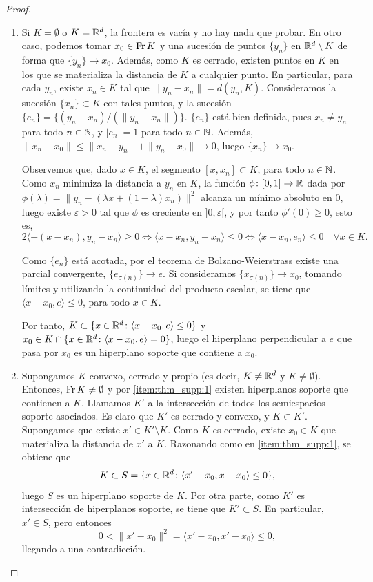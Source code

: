 \begin{proof}~
    \begin{enumerate}
        \item Si $K = \emptyset$ o $K = \mathbb{R}^d$, la frontera es vacía y no hay nada que probar. En otro caso, podemos tomar $x_0 \in \operatorname{Fr} K$ y una sucesión de puntos $\{y_n\}$ en $\mathbb{R}^d \setminus K$ de forma que $\{y_n\} \to x_0$. Además, como $K$ es cerrado, existen puntos en $K$ en los que se materializa la distancia de $K$ a cualquier punto. En particular, para cada $y_n$, existe $x_n \in K$ tal que $\|y_n - x_n\| = d(y_n,K)$. Consideramos la sucesión $\{x_n\} \subset K$ con tales puntos, y la sucesión $\{e_n\} = \{(y_n-x_n)/(\|y_n - x_n\|) \}$. $\{e_n\}$ está bien definida, pues $x_n \ne y_n$ para todo $n \in \mathbb{N}$, y $|e_n| = 1$ para todo $n \in \mathbb{N}$. Además, $\|x_n - x_0\| \le \|x_n - y_n\| + \|y_n - x_0\| \to 0$, luego $\{x_n\} \to x_0$.

        Observemos que, dado $x \in K$, el segmento $[x,x_n] \subset K$, para todo $n \in \mathbb{N}$. Como $x_n$ minimiza la distancia a $y_n$ en $K$, la función $\phi\colon [0,1] \to \mathbb{R}$ dada por $\phi(\lambda) = \|y_n - (\lambda x + (1-\lambda)x_n)\|^2$ alcanza un mínimo absoluto en 0, luego existe $\varepsilon > 0$ tal que $\phi$ es creciente en $]0,\varepsilon[$, y por tanto $\phi'(0) \ge 0$, esto es, 
        \[2\langle -(x-x_n),y_n-x_n \rangle \ge 0 \iff \langle x - x_n, y_n - x_n \rangle \le 0 \iff \langle x - x_n, e_n \rangle \le 0 \quad \forall x \in K. \]

        Como $\{e_n\}$ está acotada, por el teorema de Bolzano-Weierstrass existe una parcial convergente, $\{e_{\sigma(n)}\} \to e$. Si consideramos $\{x_{\sigma(n)}\} \to x_0$, tomando límites y utilizando la continuidad del producto escalar, se tiene que $\langle x - x_0, e \rangle \le 0$, para todo $x \in K$.

        Por tanto, $K \subset \{x\in\mathbb{R}^d \colon \langle x - x_0, e \rangle \le 0 \}$ y $x_0 \in K \cap \{x \in \mathbb{R}^d \colon \langle x - x_0, e \rangle = 0\}$, luego el hiperplano perpendicular a $e$ que pasa por $x_0$ es un hiperplano soporte que contiene a $x_0$.

        \item Supongamos $K$ convexo, cerrado y propio (es decir, $K \ne \mathbb{R}^d$ y $K \ne \emptyset$). Entonces, $\operatorname{Fr} K \ne \emptyset$ y por \ref{item:thm_supp:1} existen hiperplanos soporte que contienen a $K$. Llamamos $K'$ a la intersección de todos los semiespacios soporte asociados. Es claro que $K'$ es cerrado y convexo, y $K \subset K'$. Supongamos que existe $x' \in K' \setminus K$. Como $K$ es cerrado, existe $x_0 \in K$ que materializa la distancia de $x'$ a $K$. Razonando como en \ref{item:thm_supp:1}, se obtiene que
        \[ K \subset S = \{x \in \mathbb{R}^d \colon \langle x' - x_0, x - x_0 \rangle \le 0 \}, \]
        luego $S$ es un hiperplano soporte de $K$. Por otra parte, como $K'$ es intersección de hiperplanos soporte, se tiene que $K' \subset S$. En particular, $x' \in S$, pero entonces
        \[ 0 < \|x' - x_0\|^2 = \langle x' - x_0, x' - x_0 \rangle \le 0, \]
        llegando a una contradicción.


\end{enumerate}
\end{proof}
